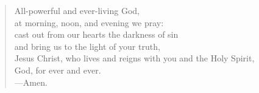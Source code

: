 \prayer

\setlength{\leftmargini}{\prayerleftmargini}

\begin{verse}
All-powerful and ever-living God,\\
at morning, noon, and evening we pray:\\
cast out from our hearts the darkness of sin\\
and bring us to the light of your truth,\\
Jesus Christ, who lives and reigns with you and the Holy Spirit,\\
God, for ever and ever.\\
{\color{red}---\thinspace}Amen.
\end{verse}

\setlength{\leftmargini}{\defleftmargini}